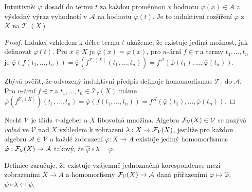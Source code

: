\noindent
Intuitivně: $\overline{\varphi}$ dosadí do termu $t$ za každou proměnnou
$x$ hodnotu $\varphi(x) \in A$ a výsledný výraz vyhodnotí v
$\mathcal{A}$ na hodnotu $\overline{\varphi}(t)$.
Je to induktivní rozšíření $\varphi$ z~$X$ na $\mathcal{T}_\tau(X)$.

\begin{proof}
Indukcí vzhledem k délce termu $t$ ukážeme, že existuje jediná možnost,
jak definovat $\varphi(t)$. Pro $x \in X$ je
$\overline{\varphi}(x) = \varphi(x)$,
pro $n$-ární $f \in \tau$ a termy $t_1, \ldots, t_n$
je $\overline{\varphi}(f(t_1,\ldots,t_n))
= \overline{\varphi}(f^{\mathcal{T}_\tau(X)}(t_1,\ldots,t_n))
= f^\mathcal{A}(\overline{\varphi}(t_1), \ldots, \overline{\varphi}(t_n))$.

Zbývá ověřit, že odvozený induktivní předpis definuje homomorfismus
$\mathcal{T}_\tau$ do $\mathcal{A}$. Pro $n$-ární $f \in \tau$ a
$t_1,\ldots, t_n \in \mathcal{T}_\tau(X)$ máme
$\overline{\varphi}(f^{\mathcal{T}_\tau(X)})(t_1,\ldots,t_n)
= \overline{\varphi}(f(t_1,\ldots,t_n))
= f^\mathcal{A}(\overline{\varphi}(t_1), \ldots, \overline{\varphi}(t_n))$.
\end{proof}

\begin{definition}
    Nechť $\mathcal{V}$ je třída $\tau$-algeber
    a $X$ libovolná množina.
    Algebra $\mathcal{F}_{\mathcal{V}}(X) \in \mathcal{V}$ se nazývá
    {\em volná} ve $\mathcal{V}$ nad $X$ vzhledem k zobrazení
    $\lambda : X \to \mathcal{F}_{\mathcal{V}}(X)$,
    jestliže pro každou algebru $\mathcal{A} \in \mathcal{V}$
    a každé zobrazení $\varphi : X \to A$ existuje jediný homomorfismus
    $\hat \varphi : \mathcal{F}_{\mathcal{V}}(X) \to \mathcal{A}$
    takový, že $\hat \varphi \circ \lambda = \varphi$.

\begin{center}
\end{center}
\end{definition}

\begin{note}
    Definice zaručuje, že existuje vzájemně jednoznačná
    korespondence mezi zobrazeními $X \to A$
    a homomorfismy $\mathcal{F}_{\mathcal{V}}(X) \to \mathcal{A}$
    daná přiřazeními $\varphi \mapsto \hat \varphi$,
    $\psi \circ \lambda \mapsfrom \psi$.
\end{note}


